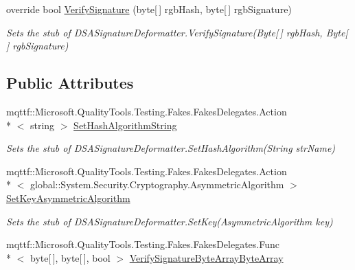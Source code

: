 \begin{DoxyCompactItemize}
override bool \hyperlink{class_system_1_1_security_1_1_cryptography_1_1_fakes_1_1_stub_d_s_a_signature_deformatter_afaf0b624c32ffce27044eac7dd7fffb5}{Verify\-Signature} (byte\mbox{[}$\,$\mbox{]} rgb\-Hash, byte\mbox{[}$\,$\mbox{]} rgb\-Signature)
\begin{DoxyCompactList}\small\item\em Sets the stub of D\-S\-A\-Signature\-Deformatter.\-Verify\-Signature(\-Byte\mbox{[}$\,$\mbox{]} rgb\-Hash, Byte\mbox{[}$\,$\mbox{]} rgb\-Signature)\end{DoxyCompactList}\end{DoxyCompactItemize}
\subsection*{Public Attributes}
\begin{DoxyCompactItemize}
\item 
mqttf\-::\-Microsoft.\-Quality\-Tools.\-Testing.\-Fakes.\-Fakes\-Delegates.\-Action\\*
$<$ string $>$ \hyperlink{class_system_1_1_security_1_1_cryptography_1_1_fakes_1_1_stub_d_s_a_signature_deformatter_ab64803f7b4f83904ae39e11480670575}{Set\-Hash\-Algorithm\-String}
\begin{DoxyCompactList}\small\item\em Sets the stub of D\-S\-A\-Signature\-Deformatter.\-Set\-Hash\-Algorithm(\-String str\-Name)\end{DoxyCompactList}\item 
mqttf\-::\-Microsoft.\-Quality\-Tools.\-Testing.\-Fakes.\-Fakes\-Delegates.\-Action\\*
$<$ global\-::\-System.\-Security.\-Cryptography.\-Asymmetric\-Algorithm $>$ \hyperlink{class_system_1_1_security_1_1_cryptography_1_1_fakes_1_1_stub_d_s_a_signature_deformatter_a78dfa4304a3842d00b6143bf6741bdea}{Set\-Key\-Asymmetric\-Algorithm}
\begin{DoxyCompactList}\small\item\em Sets the stub of D\-S\-A\-Signature\-Deformatter.\-Set\-Key(\-Asymmetric\-Algorithm key)\end{DoxyCompactList}\item 
mqttf\-::\-Microsoft.\-Quality\-Tools.\-Testing.\-Fakes.\-Fakes\-Delegates.\-Func\\*
$<$ byte\mbox{[}$\,$\mbox{]}, byte\mbox{[}$\,$\mbox{]}, bool $>$ \hyperlink{class_system_1_1_security_1_1_cryptography_1_1_fakes_1_1_stub_d_s_a_signature_deformatter_abbe7e12792be39ef534465b2025713cd}{Verify\-Signature\-Byte\-Array\-Byte\-Array}

\end{DoxyCompactItemize}
